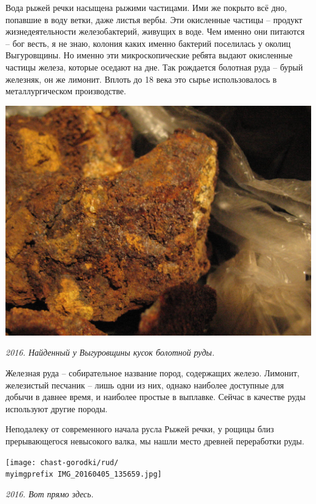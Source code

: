 Вода рыжей речки насыщена рыжими частицами. Ими же покрыто всё дно, попавшие в воду ветки, даже листья вербы. Эти окисленные частицы – продукт жизнедеятельности железобактерий, живущих в воде. Чем именно они питаются – бог весть, я не знаю, колония каких именно бактерий поселилась у околиц Выгуровщины. Но именно эти микроскопические ребята выдают окисленные частицы железа, которые оседают на дне. Так рождается болотная руда – бурый железняк, он же лимонит. Вплоть до 18 века это сырье использовалось в металлургическом производстве.
\vspace*{\fill}
\begin{center}
\includegraphics[width=\linewidth]{chast-gorodki/rud/s_IMG_4468.JPG}

\textit{2016. Найденный у Выгуровщины кусок болотной руды.}
\end{center}
\vspace*{\fill}
\newpage

Железная руда – собирательное название пород, содержащих железо. Лимонит, железистый песчаник – лишь одни из них, однако наиболее доступные для добычи в давнее время, и наиболее простые в выплавке. Сейчас в качестве руды используют другие породы.

Неподалеку от современного начала русла Рыжей речки, у рощицы близ прерывающегося невысокого валка, мы нашли место древней переработки руды.

\begin{center}
\texttt{[image: chast-gorodki/rud/\\myimgprefix IMG\_20160405\_135659.jpg]}

\textit{2016. Вот прямо здесь.}
\end{center}

